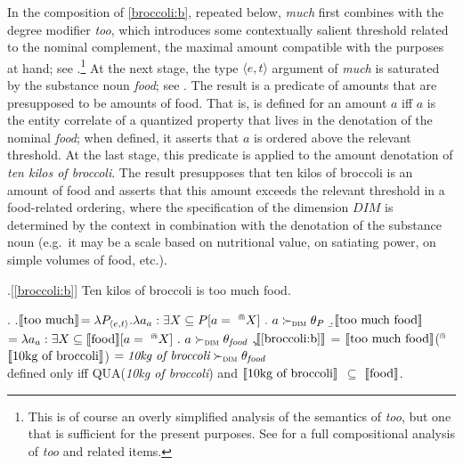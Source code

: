 \documentclass[a4paper,12pt,twoside]{article}
\newcommand{\sv}[1]{\ensuremath{\llbracket\textnormal{#1}\rrbracket}}
\begin{document}
	In the composition of \ref{broccoli:b}, repeated below, \textit{much} first combines with the degree modifier \textit{too}, which introduces some contextually salient threshold related to the  nominal complement, the maximal amount compatible with the purposes at hand; see \Next[a].\footnote{This is of course an overly simplified analysis of the semantics of \textit{too}, but one that is sufficient for the present purposes. See \citet{Meier:2003} for a full compositional analysis of \textit{too}  and related items.} At the next stage, the type $\langle e,t \rangle$ argument of \textit{much} is saturated by the substance noun \textit{food}; see \Next[b]. The result is a predicate of amounts that are presupposed to be amounts of food. That is, \Next[b] is defined for an amount $a$  iff $a$ is the entity correlate of a quantized property that lives in the denotation of the nominal \textit{food}; when defined, it asserts that $a$ is ordered above the relevant threshold. At the last stage, this predicate is applied to the amount denotation of \textit{ten kilos of broccoli}. The result \Next[c] presupposes that ten kilos of broccoli is an amount of food and asserts that this amount exceeds the relevant threshold in a food-related ordering, where the specification of the dimension $DIM$ is determined by the context in combination with the denotation of the substance noun (e.g.\ it may be a scale based on nutritional value, on satiating power, on simple volumes of food, etc.).
	
	
	\ex.[\ref{broccoli:b}] Ten kilos of broccoli is too much food.
	
	\ex.\label{much}
	\a.\label{much:a}\sv{too much}$=\lambda P_{\langle e,t\rangle} . \lambda a_{a} : \exists X \subseteq P[a = \ ^{\Cap}X] \ . \ a \succ_{\textsc{dim}} \theta_{P}$
	\b.\label{much:b}\sv{too much food}$= \lambda a_{a} : \exists X \subseteq \sv{food}[a = \ ^{\Cap}X] \ . \ a \succ_{\textsc{dim}} \theta_{\textit{food}}$
	\c.\label{much:c}\sv{\ref{broccoli:b}} = \sv{too much food}($^{\Cap}$\sv{10kg of broccoli}) $ = \textit{10kg of broccoli} \succ_{\textsc{dim}} \theta_{\textit{food}}$\\
	\hfill defined only iff QUA(\textit{10kg of broccoli}) and \sv{10kg of broccoli} $\subseteq$ \sv{food}.
	
\end{document}
